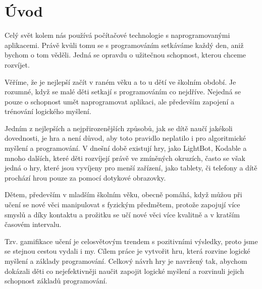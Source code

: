 \chapter{Úvod}

Celý svět kolem nás používá počítačové technologie s naprogramovanými aplikacemi. Právě kvůli tomu se s programováním setkáváme každý den, aniž bychom o tom věděli. Jedná se opravdu o užitečnou schopnost, kterou chceme rozvíjet.\par
Věříme, že je nejlepší začít v raném věku a to u dětí ve školním období. Je rozumné, když se malé děti setkají s programováním co nejdříve. Nejedná se pouze o schopnost umět naprogramovat aplikaci, ale především zapojení a trénování logického myšlení.\par
Jedním z nejlepších a nejpřirozenějších způsobů, jak se dítě naučí jakékoli dovednosti, je hra a není důvod, aby toto pravidlo neplatilo i pro algoritmické myšlení a programování. V dnešní době existují hry, jako LightBot, Kodable a mnoho dalších, které děti rozvíjejí právě ve zmíněných okruzích, často se však jedná o hry, které jsou vyvíjeny pro menší zařízení, jako tablety, či telefony a dítě prochází hrou pouze za pomocí dotykové obrazovky.\par
Dětem, především v mladším školním věku, obecně pomáhá, když můžou při učení se nové věci manipulovat s fyzickým předmětem, protože zapojují více smyslů a díky kontaktu a prožitku se učí nové věci více kvalitně a v kratším časovém intervalu.\par
Tzv. gamifikace učení je celosvětovým trendem s pozitivními výsledky, proto jsme se stejnou cestou vydali i my. Cílem práce je vytvořit hru, která rozvine logické myšlení a základy programování. Celkový návrh hry je navržený tak, abychom dokázali děti co nejefektivněji naučit zapojit logické myšlení a rozvinuli jejich schopnost základů programování.